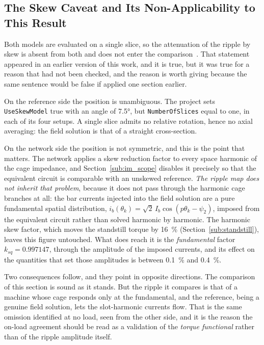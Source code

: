 \documentclass[10pt,a4paper,twocolumn]{article}
\theoremstyle{plain}
\theoremstyle{remark}
\begin{document}
\subsection{The Skew Caveat and Its Non-Applicability to This Result}

Both models are evaluated on a single slice, so the attenuation of the
ripple by skew is absent from both and does not enter the
comparison~\cite{gyselinck}. That statement appeared in an earlier
version of this work, and it is true, but it was true for a reason that
had not been checked, and the reason is worth giving because the same
sentence would be false if applied one section earlier.

On the reference side the position is unambiguous. The project sets
\texttt{UseSkewModel} true with an angle of \ang{7.5}, but
\texttt{NumberOfSlices} equal to one, in each of its four setups. A
single slice admits no relative rotation, hence no axial averaging: the
field solution is that of a straight cross-section.

On the network side the position is not symmetric, and this is the point
that matters. The network applies a skew reduction factor to every space
harmonic of the cage impedance, and Section~\ref{sub:im_scope} disables
it precisely so that the equivalent circuit is comparable with an
unskewed reference. \emph{The ripple map does not inherit that problem},
because it does not pass through the harmonic cage branches at all: the
bar currents injected into the field solution are a pure fundamental
spatial distribution, $i_b(\theta_k)=\sqrt{2}\,I_b\cos(p\theta_k-\psi_2)$,
imposed from the equivalent circuit rather than solved harmonic by
harmonic. The harmonic skew factor, which moves the standstill torque by
\SI{16}{\percent} (Section~\ref{sub:standstill}), leaves this figure
untouched. What does reach it is the \emph{fundamental} factor
$k_{sq}=\num{0.997147}$, through the amplitude of the imposed currents,
and its effect on the quantities that set those amplitudes is between
\SI{0.1}{\percent} and \SI{0.4}{\percent}.

Two consequences follow, and they point in opposite directions. The
comparison of this section is sound as it stands. But the ripple it
compares is that of a machine whose cage responds only at the
fundamental, and the reference, being a genuine field solution, lets
the slot-harmonic currents flow. That is the same omission identified at
no load, seen from the other side, and it is the reason the on-load
agreement should be read as a validation of the \emph{torque
functional} rather than of the ripple amplitude itself.
\end{document}
